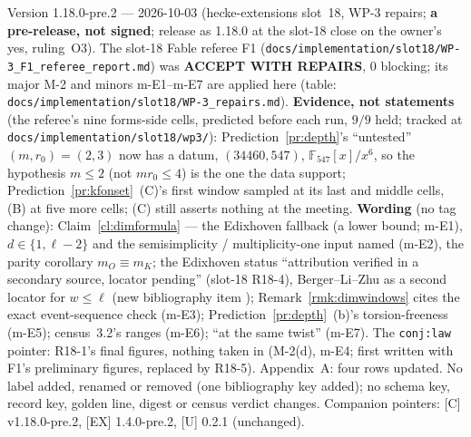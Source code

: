 \documentclass[11pt]{article}
\theoremstyle{remark}
\newcommand{\F}{\mathbb{F}}
\begin{document}
Version 1.18.0-pre.2 --- 2026-10-03 (hecke-extensions slot~18, WP-3 repairs; \textbf{a pre-release, not signed}; release as 1.18.0 at the slot-18 close
on the owner's yes, ruling~O3). The slot-18 Fable referee F1 (\texttt{docs/implementation/slot18/WP-3\_F1\_referee\_report.md}) was \textbf{ACCEPT WITH REPAIRS},
0 blocking; its major M-2 and minors m-E1--m-E7 are applied here (table: \texttt{docs/implementation/slot18/WP-3\_repairs.md}). \textbf{Evidence, not statements}
(the referee's nine forms-side cells, predicted before each run, $9/9$ held; tracked at \texttt{docs/implementation/slot18/wp3/}): Prediction~\ref{pr:depth}'s
``untested'' $(m,r_0)=(2,3)$ now has a datum, $(34460,547)$, $\F_{547}[x]/x^6$, so the hypothesis $m\le2$ (not $m r_0\le4$) is the one the data support;
Prediction~\ref{pr:kfonset}~(C)'s first window sampled at its last and middle cells, (B) at five more cells; (C) still asserts nothing at the meeting.
\textbf{Wording} (no tag change): Claim~\ref{cl:dimformula} --- the Edixhoven fallback (a lower bound; m-E1), $d\in\{1,\ell-2\}$ and the semisimplicity /
multiplicity-one input named (m-E2), the parity corollary $m_O\equiv m_K$; the Edixhoven status ``attribution verified in a secondary source, locator pending''
(slot-18 R18-4), Berger--Li--Zhu as a second locator for $w\le\ell$ (new bibliography item \cite{berger_li_zhu}); Remark~\ref{rmk:dimwindows} cites the exact
event-sequence check (m-E3); Prediction~\ref{pr:depth}~(b)'s torsion-freeness (m-E5); census~3.2's ranges (m-E6); ``at the same twist'' (m-E7). The
\texttt{conj:law} pointer: R18-1's final figures, nothing taken in (M-2(d), m-E4; first written with F1's preliminary figures, replaced by R18-5). Appendix~A: four rows updated. No label added,
renamed or removed (one bibliography key added); no schema key, record key, golden line, digest or census verdict changes. Companion pointers: [C] v1.18.0-pre.2,
[EX] 1.4.0-pre.2, [U] 0.2.1 (unchanged).
\end{document}
